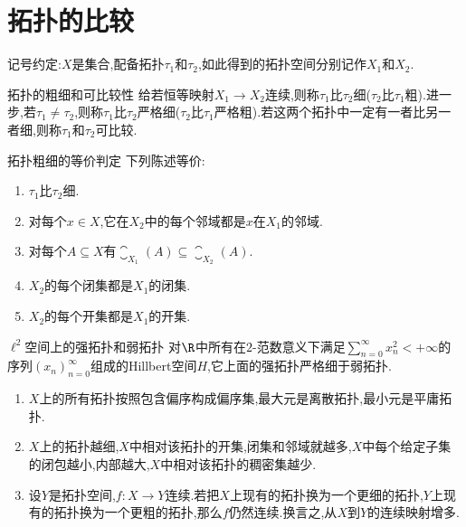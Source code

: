 \section{拓扑的比较}

记号约定:$X$是集合,配备拓扑$\tau_{1}$和$\tau_{2}$,如此得到的拓扑空间分别记作$X_{1}$和$X_{2}$.

\begin{definition}{拓扑的粗细和可比较性}{}
	给若恒等映射$X_{1}\to X_{2}$连续,则称$\tau_{1}$比$\tau_{2}$细($\tau_{2}$比$\tau_{1}$粗).进一步,若$\tau_{1}\neq\tau_{2}$,则称$\tau_{1}$比$\tau_{2}$严格细($\tau_{2}$比$\tau_{1}$严格粗).若这两个拓扑中一定有一者比另一者细,则称$\tau_{1}$和$\tau_{2}$可比较.
\end{definition}

\begin{proposition}{拓扑粗细的等价判定}{}
	下列陈述等价:
	\begin{enumerate}
		\item $\tau_{1}$比$\tau_{2}$细.
		\item 对每个$x\in X$,它在$X_{2}$中的每个邻域都是$x$在$X_{1}$的邻域.
		\item 对每个$A\subseteq X$有$\closure_{X_{1}}\left(A\right)\subseteq\closure_{X_{2}}\left(A\right)$.
		\item $X_{2}$的每个闭集都是$X_{1}$的闭集.
		\item $X_{2}$的每个开集都是$X_{1}$的开集.
	\end{enumerate}
\end{proposition}

\begin{example}{$\ell^{2}$空间上的强拓扑和弱拓扑}{}
	对$\R$中所有在$2$-范数意义下满足$\sum\limits_{n=0}^{\infty}x_{n}^{2}<+\infty$的序列$\left(x_{n}\right)_{n=0}^{\infty}$组成的Hillbert空间$H$,它上面的强拓扑严格细于弱拓扑.
\end{example}

\begin{remark}{}{}
	\begin{enumerate}
		\item $X$上的所有拓扑按照包含偏序构成偏序集,最大元是离散拓扑,最小元是平庸拓扑.
		\item $X$上的拓扑越细,$X$中相对该拓扑的开集,闭集和邻域就越多,$X$中每个给定子集的闭包越小,内部越大,$X$中相对该拓扑的稠密集越少.
		\item 设$Y$是拓扑空间,$f:X\to Y$连续.若把$X$上现有的拓扑换为一个更细的拓扑,$Y$上现有的拓扑换为一个更粗的拓扑,那么$f$仍然连续.换言之,从$X$到$Y$的连续映射增多.
	\end{enumerate}
\end{remark}
